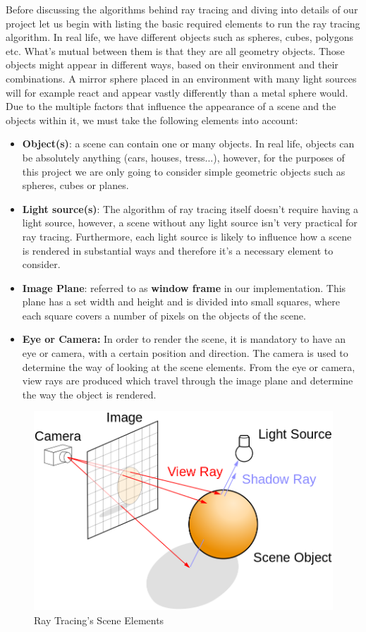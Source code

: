 \documentclass[a4paper]{report}
\begin{document}
	Before discussing the algorithms behind ray tracing and diving into details of our project let us begin with listing the basic required elements to run the ray tracing algorithm. In real life, we have different objects such as spheres, cubes, polygons etc. What's mutual between them is that they are all geometry objects. Those objects might appear in different ways, based on their environment and their combinations. A mirror sphere placed in an environment with many light sources will for example react and appear vastly differently than a metal sphere would. Due to the multiple factors that influence  the appearance of a scene and the objects within it, we must take the following elements into account:   
	\begin{itemize}
		\item \textbf{Object(s)}: a scene can contain one or many objects. In real life, objects can be absolutely anything (cars, houses, tress...), however, for the purposes of this project we are only going to consider simple geometric objects such as spheres, cubes or planes.
		\item \textbf{Light source(s)}: The algorithm of ray tracing itself doesn't require having a light source, however, a scene without any light source isn't very practical for ray tracing. Furthermore, each light source is likely to influence how a scene is rendered in substantial ways and therefore it's a necessary element to consider.
		\item \textbf{Image Plane}: referred to as \textbf{window frame} in our implementation. This plane has a set width and height and is divided into small squares, where each square covers a number of pixels on the objects of the scene.
		\item \textbf{Eye or Camera:} In order to render the scene, it is mandatory to have an eye or camera, with a certain position and direction. The camera is used to determine the way of looking at the scene elements. From the eye or camera, view rays are produced which travel through the image plane and determine the way the object is rendered.
		
	\end{itemize}
	\begin{figure}[ht!]
		\centering
		\includegraphics[scale=0.30]{./raytracing.png}
		\caption{Ray Tracing's Scene Elements \cite{scratchapixel_overview_2014}}
		\label{fig:raytracing}
	\end{figure}
\end{document}
